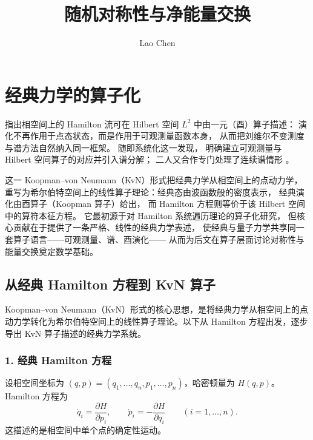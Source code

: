 ﻿\documentclass[10pt,a4paper]{article}
\numberwithin{equation}{section}
\begin{document}
\title{\textbf{随机对称性与净能量交换}\\  }
\author{Lao Chen}
\maketitle
\setcounter{tocdepth}{1}
\tableofcontents 

\section{经典力学的算子化}

\cite{Koopman1931}
指出相空间上的 Hamilton 流可在 Hilbert 空间 $L^{2}$ 中由一元（酉）算子描述：
演化不再作用于点态状态，而是作用于可观测量函数本身，
从而把刘维尔不变测度与谱方法自然纳入同一框架。
\cite{vonNeumann1932Operator}
随即系统化这一发现\cite{vonNeumann1933OperatorII}，
明确建立可观测量与 Hilbert 空间算子的对应并引入谱分解；
二人又合作专门处理了连续谱情形 \cite{KoopmanVonNeumann1932}。

这一 Koopman--von Neumann（KvN）形式把经典力学从相空间上的点动力学，
重写为希尔伯特空间上的线性算子理论：经典态由波函数般的密度表示，
经典演化由酉算子（Koopman 算子）给出，
而 Hamilton 方程则等价于该 Hilbert 空间中的算符本征方程。
它最初源于对 Hamilton 系统遍历理论的算子化研究，
但核心贡献在于提供了一条严格、线性的经典力学表述，
使经典与量子力学共享同一套算子语言——可观测量、谱、酉演化——
从而为后文在算子层面讨论对称性与能量交换奠定数学基础。

\subsection{从经典 Hamilton 方程到 KvN 算子}

Koopman--von Neumann（KvN）形式的核心思想，是将经典力学从相空间上的点动力学转化为希尔伯特空间上的线性算子理论。以下从 Hamilton 方程出发，逐步导出 KvN 算子描述的经典力学系统。

\subsubsection*{1. 经典 Hamilton 方程}

设相空间坐标为 $(q,p)=(q_1,\dots,q_n,p_1,\dots,p_n)$，哈密顿量为 $H(q,p)$。Hamilton 方程为
\begin{equation}
    \dot q_i = \frac{\partial H}{\partial p_i},
    \qquad
    \dot p_i = -\frac{\partial H}{\partial q_i}
    \qquad (i=1,\dots,n).
    \label{eq:hamilton}
\end{equation}
这描述的是相空间中单个点的确定性运动。
\end{document}
